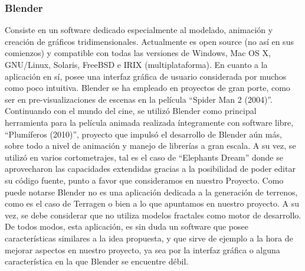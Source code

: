 \documentclass[12pt]{article} %
\begin{document}
\subsubsection{Blender}
Consiste en un software dedicado especialmente al modelado, animación y creación de gráficos tridimensionales. Actualmente es open source (no así en sus comienzos) y compatible con todas las versiones de Windows, Mac OS X, GNU/Linux, Solaris, FreeBSD e IRIX (multiplataforma). En cuanto a la aplicación en sí, posee una interfaz gráfica de usuario considerada por muchos como poco intuitiva. 
Blender se ha empleado en proyectos de gran porte, como ser en pre-visualizaciones de escenas en la película “Spider Man 2 (2004)”. Continuando con el mundo del cine, se utilizó Blender como principal herramienta para la película animada realizada íntegramente con software libre, “Plumíferos (2010)”, proyecto que impulsó el desarrollo de Blender aún más, sobre todo a nivel de animación y manejo de librerías a gran escala. A su vez, se utilizó en varios cortometrajes, tal es el caso de “Elephants Dream” donde se aprovecharon las capacidades extendidas gracias a la posibilidad de poder editar su código fuente, punto a favor que consideramos en nuestro Proyecto.
Como puede notarse Blender no es una aplicación dedicada a la generación de terrenos, como es el caso de Terragen o bien a lo que apuntamos en nuestro proyecto. A su vez, se debe considerar que no utiliza modelos fractales como motor de desarrollo. De todos modos, esta aplicación, es sin duda un software que posee características similares a la idea propuesta, y que sirve de ejemplo a la hora de mejorar aspectos en nuestro proyecto, ya sea por la interfaz gráfica o alguna característica en la que Blender se encuentre débil.
\end{document}

